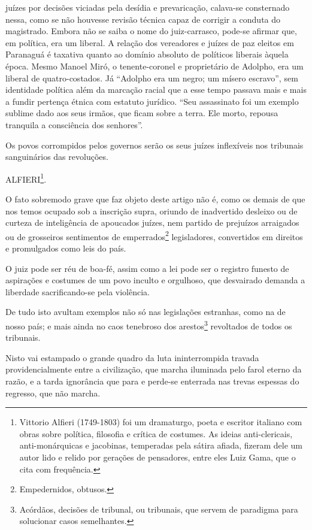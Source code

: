 \begin{didascalia}
{juízes por decisões viciadas pela desídia e prevaricação, calava-se
consternado nessa, como se não houvesse revisão técnica capaz de
corrigir a conduta do magistrado. Embora não se saiba o nome do
juiz-carrasco, pode-se afirmar que, em política, era um liberal. A
relação dos vereadores e juízes de paz eleitos em Paranaguá é taxativa
quanto ao domínio absoluto de políticos liberais àquela época. Mesmo
Manoel Miró, o tenente-coronel e proprietário de Adolpho, era um liberal
de quatro-costados. Já ``Adolpho era um negro; um mísero escravo'', sem
identidade política além da marcação racial que a esse tempo passava
mais e mais a fundir pertença étnica com estatuto jurídico. ``Seu
assassinato foi um exemplo sublime dado aos seus irmãos, que ficam sobre
a terra. Ele morto, repousa tranquila a consciência dos senhores''.}
\end{didascalia}

\asterisc{}

Os povos corrompidos pelos governos serão os seus juízes inflexíveis nos
tribunais sanguinários das revoluções.

ALFIERI\footnote{Vittorio Alfieri (1749-1803) foi um dramaturgo, poeta
  e escritor italiano com obras sobre política, filosofia e crítica de
  costumes. As ideias anti-clericais, anti-monárquicas e jacobinas,
  temperadas pela sátira afiada, fizeram dele um autor lido e relido por
  gerações de pensadores, entre eles Luiz Gama, que o cita com
  frequência.}.

O fato sobremodo grave que faz objeto deste artigo não é, como os demais
de que nos temos ocupado sob a inscrição supra, oriundo de inadvertido
desleixo ou de curteza de inteligência de apoucados juízes, nem partido
de prejuízos arraigados ou de grosseiros sentimentos de
emperrados\footnote{Empedernidos, obtusos.} legisladores, convertidos
em direitos e promulgados como leis do país.

O juiz pode ser réu de boa-fé, assim como a lei pode ser o registro
funesto de aspirações e costumes de um povo inculto e orgulhoso, que
desvairado demanda a liberdade sacrificando-se pela violência.

De tudo isto avultam exemplos não só nas legislações estranhas, como na
de nosso país; e mais ainda no caos tenebroso dos arestos\footnote{
  Acórdãos, decisões de tribunal, ou tribunais, que servem de paradigma
  para solucionar casos semelhantes.} revoltados de todos os tribunais.

Nisto vai estampado o grande quadro da luta ininterrompida travada
providencialmente entre a civilização, que marcha iluminada pelo farol
eterno da razão, e a tarda ignorância que para e perde-se enterrada nas
trevas espessas do regresso, que não marcha.


